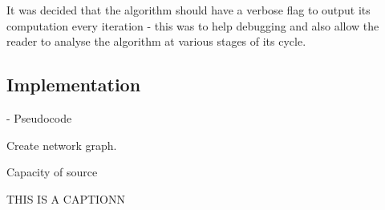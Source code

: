 It was decided that the algorithm should have a verbose flag to output
its computation every iteration - this was to help debugging and also
allow the reader to analyse the algorithm at various stages of its
cycle. 

\subsection{Implementation}

- Pseudocode



\begin{algorithm}[H]
                               
  \SetAlgoLined
  
  
  
  Create network graph.
  
  Capacity of source 
  
  \caption{THIS IS A CAPTIONN}
\end{algorithm}